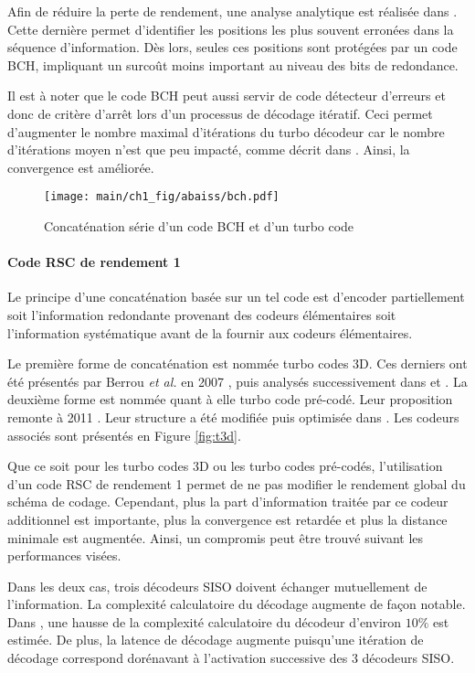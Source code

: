 Afin de réduire la perte de rendement, une analyse analytique est réalisée dans \cite{narayananBCH}. Cette dernière 
permet d’identifier les positions les plus souvent erronées dans la séquence d'information. Dès lors, seules ces 
positions sont protégées par un code BCH, impliquant un surcoût moins important au niveau des bits de redondance.

Il est à noter que le code BCH peut aussi servir de code détecteur d'erreurs et donc de critère d’arrêt lors d'un 
processus de décodage itératif. Ceci permet d'augmenter le nombre maximal d'itérations du turbo décodeur car le nombre 
d'itérations moyen n'est que peu impacté, comme décrit dans \cite{takeshitaBCH}. Ainsi, la convergence est améliorée.

\begin{figure}[!tb]
	\begin{center}
	\texttt{[image: main/ch1\_fig/abaiss/bch.pdf]}
	\end{center}
	\caption{Concaténation série d'un code BCH et d'un turbo code \label{fig:bchc}}
\end{figure}

\paragraph{Code RSC de rendement 1}
Le principe d'une concaténation basée sur un tel code est d'encoder partiellement soit l'information redondante 
provenant des codeurs élémentaires soit l'information systématique avant de la fournir aux codeurs élémentaires.

Le première forme de concaténation est nommée turbo codes 3D. Ces derniers ont été présentés par Berrou \textit{et al.} 
en 2007 \cite{TC3D_1}, puis analysés successivement dans \cite{TC3D_2} et \cite{TC3D_3}.
La deuxième forme est nommée quant à elle turbo code pré-codé. Leur proposition remonte à 2011 \cite{precoded}. Leur structure a 
été modifiée puis optimisée dans \cite{precoding}. Les codeurs associés sont présentés en Figure \ref{fig:t3d}.

Que ce soit pour les turbo codes 3D ou les turbo codes pré-codés, l'utilisation d'un code RSC de rendement 1 permet de 
ne pas modifier le rendement global du schéma de codage. Cependant, plus la part d'information traitée par ce codeur 
additionnel est importante, plus la convergence est retardée et plus la distance minimale est augmentée. Ainsi, un 
compromis peut être trouvé suivant les performances visées. 

Dans les deux cas, trois décodeurs SISO doivent échanger mutuellement de l'information. La complexité calculatoire du 
décodage augmente de façon notable. Dans \cite{TC3D_2}, une hausse de la complexité calculatoire du décodeur  d'environ 
$10\%$ est estimée. De plus, la latence de décodage augmente puisqu'une itération de décodage correspond dorénavant à 
l'activation successive des 3 décodeurs SISO.

